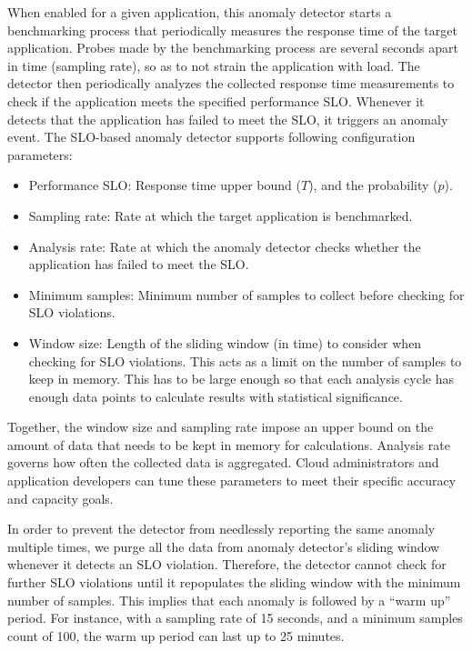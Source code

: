 When enabled for a given application, this anomaly detector starts a benchmarking process
that periodically measures the response time of the target application. Probes made by the benchmarking 
process are several seconds apart in time (sampling rate), so as to not strain the application with load.
The detector then periodically
analyzes the collected response time measurements to check if the application meets the specified performance
SLO. Whenever it detects that the application has failed to meet the SLO, it triggers an anomaly event. 
The SLO-based anomaly detector supports following configuration parameters:
\begin{itemize}
\item Performance SLO: Response time upper bound ($T$), and the probability ($p$).
\item Sampling rate: Rate at which the target application is benchmarked.
\item Analysis rate: Rate at which the anomaly detector checks whether the application has failed to meet the SLO.
\item Minimum samples: Minimum number of samples to collect before checking for SLO violations.
\item Window size: Length of the sliding window (in time) to consider when checking for SLO violations. This
acts as a limit on the number of samples to keep in memory. This has to be large enough so that each analysis
cycle has enough data points to calculate results with statistical significance.
\end{itemize}

Together, the window size and sampling rate impose an upper bound on the amount of data that needs to be kept in 
memory for calculations. Analysis rate governs how often the collected data is aggregated. Cloud administrators and
application developers can tune these parameters to meet their specific accuracy and capacity goals.

In order to prevent the detector from needlessly reporting the same anomaly multiple times,
we purge all the data from anomaly detector's sliding window whenever it detects an SLO violation.
Therefore, the detector cannot check for further SLO violations until it repopulates the sliding window 
with the minimum number of samples. This implies that each anomaly is followed by a ``warm up'' period.
For instance, with a sampling rate of 15 seconds, and a minimum
samples count of 100, the warm up period can last up to 25 minutes.

